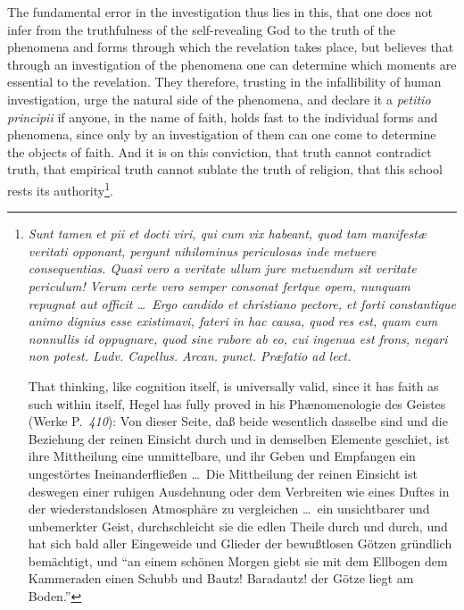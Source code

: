 \documentclass[12pt]{book}
\newcommand{\opage}[1]{\marginnote{\footnotesize\textit{[#1]}}}
\begin{document}
\opage{90} \setcounter{footnote}{0}%
The fundamental error in the investigation thus lies in this, that one does
not infer from the truthfulness of the self-revealing God to the truth of the
phenomena and forms through which the revelation takes place, but believes that
through an investigation of the phenomena one can determine which moments are
essential to the revelation. They therefore, trusting in the infallibility of
human investigation, urge the natural side of the phenomena, and declare it a
\textit{petitio principii} if anyone, in the name of faith, holds fast to the
individual forms and phenomena, since only by an investigation of them can one
come to determine the objects of faith. And it is on this conviction, that
truth cannot contradict truth, that empirical truth cannot sublate the truth of
religion, that this school rests its authority\footnote{\textit{Sunt tamen et
pii et docti viri, qui cum vix habeant, quod tam manifestæ veritati opponant,
pergunt nihilominus periculosas inde metuere consequentias. Quasi vero a
veritate ullum jure metuendum sit veritate periculum! Verum certe vero semper
consonat fertque opem, nunquam repugnat aut officit \ldots\ Ergo candido et
christiano pectore, et forti constantique animo dignius esse existimavi, fateri
in hac causa, quod res est, quam cum nonnullis id oppugnare, quod sine rubore
ab eo, cui ingenua est frons, negari non potest. Ludv. Capellus. Arcan. punct.
Præfatio ad lect.}\par
That thinking, like cognition itself, is universally valid, since it has faith
as such within itself, Hegel has fully proved in his Phænomenologie des Geistes
(Werke P.~\textit{410}): Von dieser Seite, daß beide wesentlich dasselbe sind
und die Beziehung der reinen Einsicht durch und in demselben Elemente geschiet,
ist ihre Mittheilung eine unmittelbare, und ihr Geben und Empfangen ein
ungestörtes Ineinanderfließen \ldots\ Die Mittheilung der reinen Einsicht ist
deswegen einer ruhigen Ausdehnung oder dem Verbreiten wie eines Duftes in der
wiederstandslosen Atmosphäre zu vergleichen \ldots\ ein unsichtbarer und
unbemerkter Geist, durchschleicht sie die edlen Theile durch und durch, und hat
sich bald aller Eingeweide und Glieder der bewußtlosen Götzen gründlich
bemächtigt, und ``an einem schönen Morgen giebt sie mit dem Ellbogen dem
Kammeraden einen Schubb und Bautz! Baradautz! der Götze liegt am Boden.''}.
\end{document}
